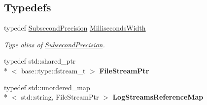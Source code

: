 \subsection*{Typedefs}
\begin{DoxyCompactItemize}
\item 
\hypertarget{namespaceel_1_1base_abbc234f4907eccec2673dfc6efaa5925}{typedef \hyperlink{classel_1_1base_1_1SubsecondPrecision}{Subsecond\-Precision} \hyperlink{namespaceel_1_1base_abbc234f4907eccec2673dfc6efaa5925}{Milliseconds\-Width}}\label{namespaceel_1_1base_abbc234f4907eccec2673dfc6efaa5925}

\begin{DoxyCompactList}\small\item\em Type alias of \hyperlink{classel_1_1base_1_1SubsecondPrecision}{Subsecond\-Precision}. \end{DoxyCompactList}\item 
\hypertarget{namespaceel_1_1base_a8b10bcfd674533f8340cd8c39fbf5233}{typedef std\-::shared\-\_\-ptr\\*
$<$ base\-::type\-::fstream\-\_\-t $>$ {\bfseries File\-Stream\-Ptr}}\label{namespaceel_1_1base_a8b10bcfd674533f8340cd8c39fbf5233}

\item 
\hypertarget{namespaceel_1_1base_a6f440ada16117d20b5b5fc75b2f3a80f}{typedef std\-::unordered\-\_\-map\\*
$<$ std\-::string, File\-Stream\-Ptr $>$ {\bfseries Log\-Streams\-Reference\-Map}}\label{namespaceel_1_1base_a6f440ada16117d20b5b5fc75b2f3a80f}

\end{DoxyCompactItemize}
